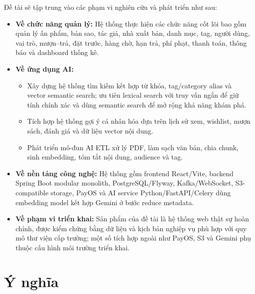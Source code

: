 Đề tài sẽ tập trung vào các phạm vi nghiên cứu và phát triển như sau:
\begin{itemize}
    \item \textbf{Về chức năng quản lý:} Hệ thống thực hiện các chức năng cốt
    lõi bao gồm quản lý ấn phẩm, bản sao, tác giả, nhà xuất bản, danh mục, tag,
    người dùng, vai trò, mượn--trả, đặt trước, hàng chờ, hạn trả, phí phạt,
    thanh toán, thông báo và dashboard thống kê.

    \item \textbf{Về ứng dụng AI:}
    \begin{itemize}
        \item Xây dựng hệ thống tìm kiếm kết hợp từ khóa, tag/category alias và
        vector semantic search; ưu tiên lexical search với truy vấn ngắn để giữ
        tính chính xác và dùng semantic search để mở rộng khả năng khám phá.
        \item Tích hợp hệ thống gợi ý cá nhân hóa dựa trên lịch sử xem, wishlist,
        mượn sách, đánh giá và dữ liệu vector nội dung.
        \item Phát triển mô-đun AI ETL xử lý PDF, làm sạch văn bản, chia chunk,
        sinh embedding, tóm tắt nội dung, audience và tag.
    \end{itemize}

    \item \textbf{Về nền tảng công nghệ:} Hệ thống gồm frontend React/Vite,
    backend Spring Boot modular monolith, PostgreSQL/Flyway, Kafka/WebSocket,
    S3-compatible storage, PayOS và AI service Python/FastAPI/Celery dùng
    embedding model kết hợp Gemini ở bước reduce metadata.

    \item \textbf{Về phạm vi triển khai:} Sản phẩm của đề tài là hệ thống web thật sự
    hoàn chỉnh, được kiểm chứng bằng dữ liệu và kịch bản
    nghiệp vụ phù hợp với quy mô thư viện cấp trường; một số tích hợp
    ngoài như PayOS, S3 và Gemini phụ thuộc cấu hình môi trường triển khai.
\end{itemize}

\section{Ý nghĩa}
\label{sec:YNghia}

